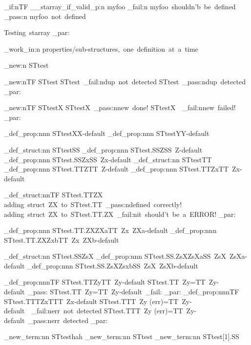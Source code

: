 \documentclass{article}
\begin{document}



\bool_if:nTF { \__starray_if_valid_p:n {myfoo} }
  {  \sttests_fail:n {myfoo~shouldn'b~be~defined } }
  {   \sttests_pass:n {myfoo~not~defined } }
%


\par\noindent
{\sc Testing~starray}
\sttests_par:

\sttests_work_in:n {properties/sub-structures,~one~definition~at~a~time}

\starray_new:n {STtest}

\starray_new:nTF {STtest}
  {STtest~\sttests_fail:n{dup~not~detected}}
  {STtest~\sttests_pass:n{dup~detected}}
\sttests_par:

\starray_new:nTF {STtestX}
  {STtestX~\sttests_pass:n{new~done!}}
  {STtestX~~\sttests_fail:n{new~failed!}}
\sttests_par:

\starray_def_prop:nnn {STtest}{X}{X-default}
\starray_def_prop:nnn {STtest}{Y}{Y-default}

\starray_def_struct:nn {STtest}{SS}
\starray_def_prop:nnn {STtest.SS}{Z}{SS~Z-default}
\starray_def_prop:nnn {STtest.SS}{Zx}{SS~Zx-default}
\starray_def_struct:nn {STtest}{TT}
\starray_def_prop:nnn {STtest.TT}{Z}{TT~Z-default}
\starray_def_prop:nnn {STtest.TT}{Zx}{TT~Zx-default}

\starray_def_struct:nnTF {STtest.TT}{ZX}
  {adding~struct~ZX~to~STtest.TT~\sttests_pass:n{defined~correctly!}}
  {adding~struct~ZX~to~STtest.TT.ZX~\sttests_fail:n{it~should't~be~a~ERROR!}}
\sttests_par:
  
\starray_def_prop:nnn {STtest.TT.ZX}{ZXa}{TT~Zx~ZXa-default}
\starray_def_prop:nnn {STtest.TT.ZX}{Zxb}{TT~Zx~ZXb-default}

\starray_def_struct:nn {STtest.SS}{ZsX}
\starray_def_prop:nnn {STtest.SS.ZsX}{ZsXa}{SS~ZsX~ZsXa-default}
\starray_def_prop:nnn {STtest.SS.ZsX}{Zsxb}{SS~ZsX~ZsXb-default}

\starray_def_prop:nnnTF {STtest.TT}{Zy}{TT~Zy-default}
  {STtest.TT~Zy=TT~Zy-default~\sttests_pass:}
  {STtest.TT~Zy=TT~Zy-default~\sttests_fail:}
\sttests_par:
\starray_def_prop:nnnTF {STtest.TTT}{Zx}{TTT~Zx-default}
  {STtest.TTT~Zy (err)=TT~Zy-default~~\sttests_fail:n{err~not~detected}}
  {STtest.TTT~Zy (err)=TT~Zy-default~\sttests_pass:n{err~detected}}
\sttests_par:

\starray_new_term:nn {STtest}{hah}
\starray_new_term:nn {STtest}{}
\starray_new_term:nn {STtest[1].SS}{}
\end{document}
